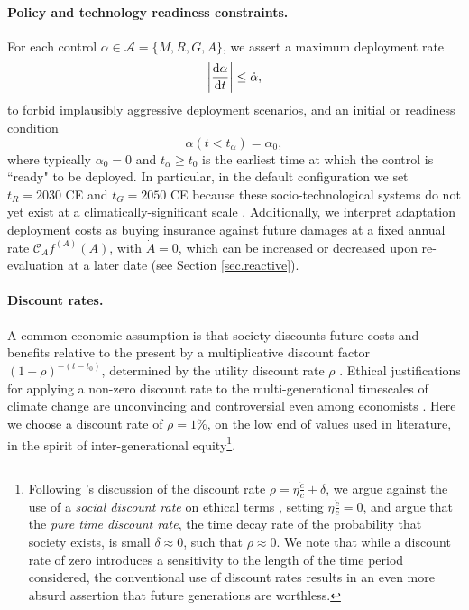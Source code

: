 \documentclass{article}
\begin{document}
\paragraph{Policy and technology readiness constraints.} For each control $\alpha \in \mathcal{A} = \{ M, R, G, A\}$, we assert a maximum deployment rate
\begin{equation}
    \abs{\dv{\alpha}{t}} \le \dot{\alpha},
\end{equation}
to forbid implausibly aggressive deployment scenarios, and an initial or readiness condition
\begin{equation}
    \alpha(t < t_{\alpha}) = \alpha_{0},
\end{equation} where typically $\alpha_{0} = 0$ and $t_{\alpha} \ge t_{0}$ is the earliest time at which the control is ``ready" to be deployed. In particular, in the default configuration we set $t_{R} = 2030$ CE and $t_{G} = 2050$ CE because these socio-technological systems do not yet exist at a climatically-significant scale \citep{minx_negative_2018, flegal_solar_2019}. Additionally, we interpret adaptation deployment costs as buying insurance against future damages at a fixed annual rate $\mathcal{C}_{A} f^{(A)}(A)$, with $\dot{A} = 0$, which can be increased or decreased upon re-evaluation at a later date (see Section \ref{sec.reactive}).

\paragraph{Discount rates.} A common economic assumption is that society discounts future costs and benefits relative to the present by a multiplicative discount factor $(1 + \rho)^{-(t-t_{0})}$, determined by the utility discount rate $\rho$ \citep[e.g. see reviews in][]{broome_discounting_1994, stern_economics_2007}. Ethical justifications for applying a non-zero discount rate to the multi-generational timescales of climate change are unconvincing and controversial even among economists \citep{ramsey_mathematical_1928, solow_economics_1974, stern_economics_2007}. Here we choose a discount rate of $\rho = 1\%$, on the low end of values used in literature, in the spirit of inter-generational equity\footnote{Following \cite{stern_economics_2007}'s discussion of the discount rate $\rho = \eta \frac{\dot{c}}{c} + \delta$, we argue against the use of a \textit{social discount rate} on ethical terms \citep{ramsey_mathematical_1928, solow_economics_1974}, setting $\eta \frac{\dot{c}}{c}=0$, and argue that the \textit{pure time discount rate}, the time decay rate of the probability that society exists, is small $\delta \approx 0$, such that $\rho \approx 0$. We note that while a discount rate of zero introduces a sensitivity to the length of the time period considered, the conventional use of discount rates results in an even more absurd assertion that future generations are worthless.}. 
\end{document}
